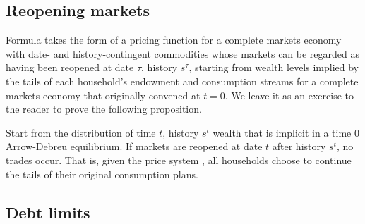 





\subsection{Reopening markets}

Formula   takes the form of a pricing
function for a complete markets economy with date- and history-contingent
commodities whose markets can be regarded as having been reopened at date $\tau$, history
$s^\tau$, starting from   wealth levels implied by the tails of each household's
endowment and consumption streams for a complete markets economy that originally convened at $t=0$.
 We leave it as an exercise to the
reader to prove the following proposition.


\medskip
{} Start from the distribution of time
$t$, history $s^t$ wealth that is implicit in a time $0$ Arrow-Debreu
equilibrium. If markets are reopened at date $t$ after history
$s^t$, no trades  occur. That is,  given the  price system
, all households choose to continue the  tails of their
original consumption plans.
\medskip
{}






 
\subsection{Debt limits}

